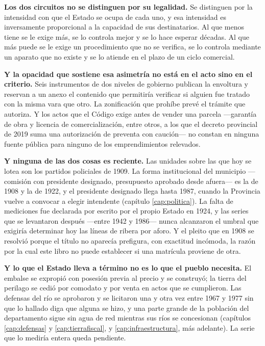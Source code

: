 \textbf{Los dos circuitos no se distinguen por su legalidad.} Se distinguen por la intensidad con que el Estado se ocupa de cada uno, y esa intensidad es inversamente proporcional a la capacidad de sus destinatarios. Al que menos tiene se le exige más, se lo controla mejor y se lo hace esperar décadas. Al que más puede se le exige un procedimiento que no se verifica, se lo controla mediante un aparato que no existe y se lo atiende en el plazo de un ciclo comercial.

\textbf{Y la opacidad que sostiene esa asimetría no está en el acto sino en el criterio.} Seis instrumentos de dos niveles de gobierno publican la envoltura y reservan a un anexo el contenido que permitiría verificar si alguien fue tratado con la misma vara que otro. La zonificación que prohíbe prevé el trámite que autoriza. Y los actos que el Código exige antes de vender una parcela ---garantía de obra y licencia de comercialización, entre otros, a los que el decreto provincial de 2019 suma una autorización de preventa con caución--- no constan en ninguna fuente pública para ninguno de los emprendimientos relevados.

\textbf{Y ninguna de las dos cosas es reciente.} Las unidades sobre las que hoy se lotea son los partidos policiales de 1909. La forma institucional del municipio —comisión con presidente designado, presupuesto aprobado desde afuera— es la de 1908 y la de 1922, y el presidente designado llega hasta 1987, cuando la Provincia vuelve a convocar a elegir intendente (capítulo \ref{cap:politica}). La falta de mediciones fue declarada por escrito por el propio Estado en 1924, y las series que se levantaron después ---entre 1942 y 1986--- nunca alcanzaron el umbral que exigiría determinar hoy las líneas de ribera por aforo. Y el pleito que en 1908 se resolvió porque el título no aparecía prefigura, con exactitud incómoda, la razón por la cual este libro no puede establecer si una matrícula proviene de otra.

\textbf{Y lo que el Estado lleva a término no es lo que el pueblo necesita.} El embalse se expropió con posesión previa al precio y se construyó; la tierra del perilago se cedió por comodato y por venta en actos que se cumplieron. Las defensas del río se aprobaron y se licitaron una y otra vez entre 1967 y 1977 sin que lo hallado diga que alguna se hizo, y una parte grande de la población del departamento sigue sin agua de red mientras sus ríos se concesionan (capítulos \ref{cap:defensas} y \ref{cap:tierrafiscal}, y \ref{cap:infraestructura}, más adelante). La serie que lo mediría entera queda pendiente.

